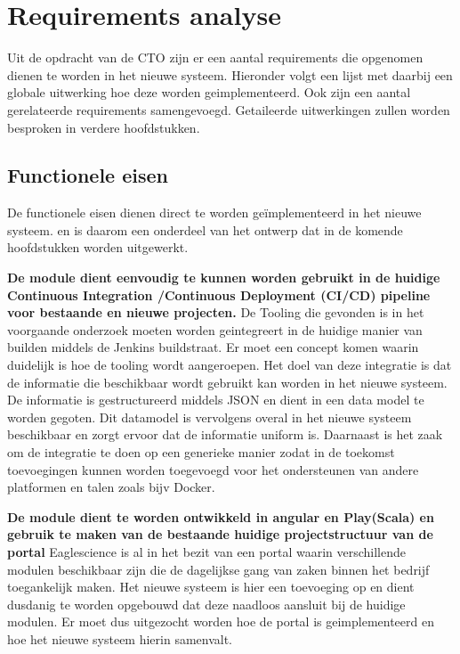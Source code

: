 \section{Requirements analyse}\label{sec:requirementsAnalyse}
Uit de opdracht van de CTO zijn er een aantal requirements die opgenomen dienen te worden in het nieuwe systeem. Hieronder volgt een lijst met daarbij een globale uitwerking hoe deze worden geimplementeerd. Ook zijn een aantal gerelateerde requirements samengevoegd. Getaileerde uitwerkingen zullen worden besproken in verdere hoofdstukken.

\subsection{Functionele eisen}\label{subsec:functionele-eisen}
De functionele eisen dienen direct te worden geïmplementeerd in het nieuwe systeem. en is daarom een onderdeel van het ontwerp dat in de komende hoofdstukken worden uitgewerkt.

\textbf{De module dient eenvoudig te kunnen worden gebruikt in de huidige Continuous Integration /Continuous Deployment (CI/CD) pipeline voor bestaande en nieuwe projecten.} De Tooling die gevonden is in het voorgaande onderzoek moeten worden geintegreert in de huidige manier van builden middels de Jenkins buildstraat. Er moet een concept komen waarin duidelijk is hoe de tooling wordt aangeroepen. Het doel van deze integratie is dat de informatie die beschikbaar wordt gebruikt kan worden in het nieuwe systeem. De informatie is gestructureerd middels JSON en dient in een data model te worden gegoten. Dit datamodel is vervolgens overal in het nieuwe systeem beschikbaar en zorgt ervoor dat de informatie uniform is. Daarnaast is het zaak om de integratie te doen op een generieke manier zodat in de toekomst toevoegingen kunnen worden toegevoegd voor het ondersteunen van andere platformen en talen zoals bijv Docker.


\textbf{De module dient te worden ontwikkeld in angular en Play(Scala) en gebruik te maken van de bestaande huidige projectstructuur van de portal} Eaglescience is al in het bezit van een portal waarin verschillende modulen beschikbaar zijn die de dagelijkse gang van zaken binnen het bedrijf toegankelijk maken. Het nieuwe systeem is hier een toevoeging op en dient dusdanig te worden opgebouwd dat deze naadloos aansluit bij de huidige modulen. Er moet dus uitgezocht worden hoe de portal is geimplementeerd en hoe het nieuwe systeem hierin samenvalt.

